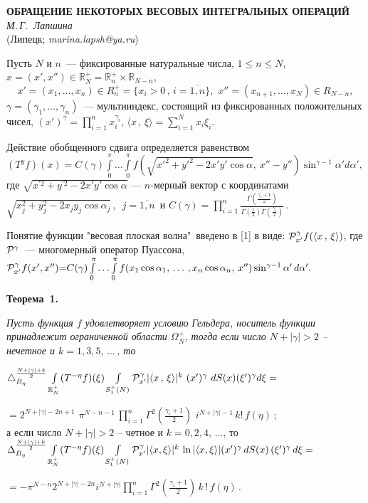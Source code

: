 \begin{center}{
	\bf
	ОБРАЩЕНИЕ НЕКОТОРЫХ ВЕСОВЫХ ИНТЕГРАЛЬНЫХ ОПЕРАЦИЙ
} \\
{\it М.\,Г.~Лапшина } \\
(Липецк; {\it marina.lapsh@ya.ru})
\end{center}


Пусть $N$ и $n$~--- фиксированные натуральные числа, $1\leqslant n\leqslant N $,
$x=(x',x'')\in \mathbb{R}_N^+=\mathbb{R}_n^+\times\mathbb{R}_{N-n}$,
$$x'{=}(x_1,\ldots,x_n)\in R_n^+{=}\{x_i{>}0\,,\, i{=}\overline{1,n}\},\,\,
x''{=}(x_{n+1},\ldots,x_N)\in R_{N{-}n},$$
$\gamma{=}(\gamma_1,\ldots,\gamma_n)$~--- мультииндекс, состоящий из
фиксированных положительных чисел, $(x')^\gamma=\prod_{i=1}^n x_i^{\gamma_i}$,
$\langle x\,,\,\xi\rangle{=}\sum_{i=1}^{N}x_i\xi_i$.

Действие обобщенного сдвига определяется  равенством\\
$
(T^y f)(x){=}C(\gamma)\int\limits_{0}^{\pi}
\ldots \int\limits_{0}^{\pi}
f\left(\sqrt{x'^2{+}y'^2{-}2x'y'\cos\alpha},\,
 x''{-}y''\right)\sin^{\gamma-1}\alpha' d\alpha',
$ \\
где $\sqrt{x^{'2}+y^{'2}-2x'y'\cos\alpha}$ --- $n$-мерный вектор  с координатами\\
$\sqrt{x_j^{2}+y_j^{2}-2x_jy_j\cos\alpha_j}\,,\,\,\, j=\overline{1,n}$\, и
$
C(\gamma)=\prod\limits_{i=1}^n\frac{\Gamma\left(\frac{\gamma_i+1}{2}\right)}
{\Gamma\left(\frac{1}{2}\right)\Gamma\left(\frac{\gamma_i}{2}\right)}\,.
$

Понятие функции "весовая плоская волна"\, введено в [1] в виде:
${\cal P}^\gamma_{x'} f(\langle x\,,\,\xi\rangle)$,
где ${\cal P}^\gamma$~--- многомерный оператор Пуассона,\\
$
{\cal P}^\gamma_{x'} f(x',x''){=}C(\gamma)
\int\limits_0^\pi\ldots \int\limits_0^\pi f(x_1\cos\alpha_1,\,\ldots\,,x_n\cos\alpha_n,\,x'')
\sin^{\gamma-1}\alpha'\,d\alpha'.
$

\smallskip
\textbf{Теорема~1.}
{\it Пусть функция $f$ удовлетворяет условию Гельдера, носитель функции принадлежит ограниченной области $\Omega_{N}^+$,
тогда если число $N+|\gamma|>2$ -- нечетное и $k=1,3,5,\,\ldots\,$, то

$
\triangle_{B_{\eta}}^{\frac{N+|\gamma|+k}{2}}
\int\limits_{\mathbb{R}_N^+}(T^{-\eta}f)(\xi)
\int\limits_{S^+_1(N)}{\cal P}_{x'}^\gamma |\langle x\,,\,\xi\rangle|^k\,\,
(x')^\gamma\,\,dS(x)(\xi')^{\gamma} d\xi=
$

$
=2^{N+|\gamma|-2n+1}\,\,
\pi^{N-n-1}\,
\prod\limits_{i=1}^{n}\Gamma^2\left(\frac{\gamma_i+1}{2}\right)
\,\,i^{N+|\gamma|-1}\,k!
\, f(\eta)\,;
$\\
а если
число $N+|\gamma|>2$ -- четное и $k=0,2,4,\,\ldots$, то\\
$
\Delta_{B_{\eta}}^{\frac{N+|\gamma|+k}{2}}\int\limits_{\mathbb{R}_N^+}(T^{-\eta}f)(\xi)
\int\limits_{S_1^+(N)}{\cal P}_{x'}^\gamma |\langle x,\xi \rangle|^k\,\ln|\langle x,\xi \rangle|
(x')^{\gamma}\,dS(x)\,(\xi')^{\gamma}\,d\xi=
$

$
=-\pi^{N-n} 2^{N+|\gamma|-2n} i^{N+|\gamma|}
\prod\limits_{i=1}^{n}\Gamma^2\left(\frac{\gamma_i+1}{2}\right)\,k\,!\,f(\eta)\,.
$}

